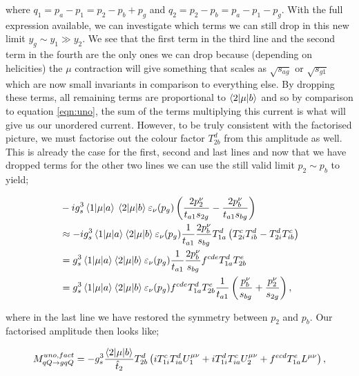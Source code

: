 where $q_1 = p_a - p_1 = p_2 - p_b + p_g$ and $q_2 = p_2 - p_b = p_a - p_1 - p_g$. With the full expression available, we can investigate which terms we can still drop in this new limit $y_g \sim y_1 \gg y_2$. We see that the first term in the third line and the second term in the fourth are the only ones we can drop because (depending on helicities) the $\mu$ contraction will give something that scales as $\sqrt{s_{ag}}$ or $\sqrt{s_{g1}}$ which are now small invariants in comparison to everything else. By dropping these terms, all remaining terms are proportional to $\mathinner{\langle2\vert\mu\vert b\rangle}_{}$ and so by comparison to equation \ref{eqn:uno}, the sum of the terms multiplying this current is what will give us our unordered current. However, to be truly consistent with the factorised picture, we must factorise out the colour factor $T^d_{2b}$ from this amplitude as well. This is already the case for the first, second and last lines and now that we have dropped terms for the other two lines we can use the still valid limit $p_2 \sim p_b$ to yield;

\begin{equation}
\begin{split}
& -ig_s^3 \mathinner{\langle1\vert\mu\vert a\rangle}_{}{} \mathinner{\langle2\vert\mu\vert b\rangle}_{} \varepsilon_\nu(p_g) \left(\frac{2p_2^\nu}{t_{a1} s_{2g}} - \frac{2p_b^\nu}{t_{a1} s_{bg}} \right) \\
& \approx -i g_s^3 \mathinner{\langle1\vert\mu\vert a\rangle}_{} \mathinner{\langle2\vert\mu\vert b\rangle}_{} \varepsilon_\nu(p_g) \frac{1}{t_{a1}}\frac{2p_b^\nu}{s_{bg}} T^d_{1a}\left(T^c_{2i}T^d_{ib} - T^d_{2i}T^c_{ib}\right)  \\
&= g_s^3 \mathinner{\langle1\vert\mu\vert a\rangle}_{} \mathinner{\langle2\vert\mu\vert b\rangle}_{} \varepsilon_\nu(p_g) \frac{1}{t_{a1}} \frac{2 p_b^\nu}{s_{bg}} f^{cde}T^d_{1a}T^e_{2b} \\
&= g_s^3 \mathinner{\langle1\vert\mu\vert a\rangle}_{} \mathinner{\langle2\vert\mu\vert b\rangle}_{} \varepsilon_\nu(p_g) f^{cde}T^d_{1a}T^e_{2b} \frac{1}{t_{a1}} \left(\frac{p_b^\nu}{s_{bg}}+\frac{p_2^\nu}{s_{2g}} \right),
\end{split}
\end{equation}

where in the last line we have restored the symmetry between $p_2$ and $p_b$. Our factorised amplitude then looks like;

\begin{equation}
M_{qQ \to gqQ}^{uno, fact} = -g_s^3 \frac{\mathinner{\langle2\vert\mu\vert b\rangle}_{}}{\hat{t}_2}T_{2b}^d \left(iT^c_{1i}T^d_{ia}U_1^{\mu \nu} + iT^d_{1i}T^c_{ia}U_2^{\mu \nu} + f^{ecd}T^e_{1a}L^{\mu \nu} \right),
\end{equation}

